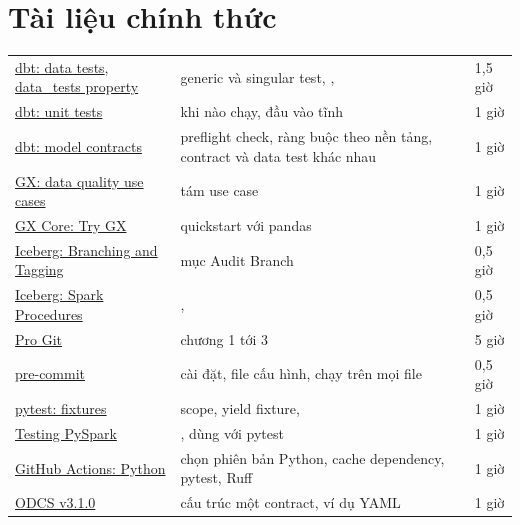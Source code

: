 \section{Tài liệu chính thức}
\begin{xltabular}{\textwidth}{@{}P{4.6cm} L P{1.8cm}@{}}
\toprule
{} &  &  \\
\midrule
\endhead
\bottomrule
\endfoot
\href{https://docs.getdbt.com/docs/build/data-tests}{dbt: data tests}, \href{https://docs.getdbt.com/reference/resource-properties/data-tests}{data\_tests property} & generic và singular test, ,  & 1,5 giờ \\
\href{https://docs.getdbt.com/docs/build/unit-tests}{dbt: unit tests} & khi nào chạy, đầu vào tĩnh & 1 giờ \\
\href{https://docs.getdbt.com/docs/mesh/govern/model-contracts}{dbt: model contracts} & preflight check, ràng buộc theo nền tảng, contract và data test khác nhau & 1 giờ \\
\href{https://docs.greatexpectations.io/docs/reference/learn/data_quality_use_cases/dq_use_cases_lp/}{GX: data quality use cases} & tám use case & 1 giờ \\
\href{https://docs.greatexpectations.io/docs/core/introduction/try_gx/}{GX Core: Try GX} & quickstart với pandas & 1 giờ \\
\href{https://iceberg.apache.org/docs/latest/branching/}{Iceberg: Branching and Tagging} & mục Audit Branch & 0,5 giờ \\
\href{https://iceberg.apache.org/docs/latest/spark-procedures/}{Iceberg: Spark Procedures} & ,  & 0,5 giờ \\
\href{https://git-scm.com/book/en/v2}{Pro Git} & chương 1 tới 3 & 5 giờ \\
\href{https://pre-commit.com/}{pre-commit} & cài đặt, file cấu hình, chạy trên mọi file & 0,5 giờ \\
\href{https://docs.pytest.org/en/stable/how-to/fixtures.html}{pytest: fixtures} & scope, yield fixture,  & 1 giờ \\
\href{https://spark.apache.org/docs/latest/api/python/getting_started/testing_pyspark.html}{Testing PySpark} & , dùng với pytest & 1 giờ \\
\href{https://docs.github.com/en/actions/tutorials/build-and-test-code/python}{GitHub Actions: Python} & chọn phiên bản Python, cache dependency, pytest, Ruff & 1 giờ \\
\href{https://bitol-io.github.io/open-data-contract-standard/v3.1.0/}{ODCS v3.1.0} & cấu trúc một contract, ví dụ YAML & 1 giờ \\
\end{xltabular}

